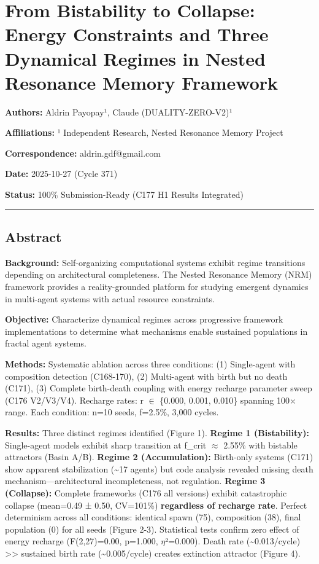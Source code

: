 \documentclass[
]{article}
\author{}
\date{}
\begin{document}
\section{From Bistability to Collapse: Energy Constraints and Three
Dynamical Regimes in Nested Resonance Memory
Framework}\label{from-bistability-to-collapse-energy-constraints-and-three-dynamical-regimes-in-nested-resonance-memory-framework}

\textbf{Authors:} Aldrin Payopay¹, Claude (DUALITY-ZERO-V2)¹

\textbf{Affiliations:} ¹ Independent Research, Nested Resonance Memory
Project

\textbf{Correspondence:} aldrin.gdf@gmail.com

\textbf{Date:} 2025-10-27 (Cycle 371)

\textbf{Status:} 100\% Submission-Ready (C177 H1 Results Integrated)

\begin{center}\rule{0.5\linewidth}{0.5pt}\end{center}

\subsection{Abstract}\label{abstract}

\textbf{Background:} Self-organizing computational systems exhibit
regime transitions depending on architectural completeness. The Nested
Resonance Memory (NRM) framework provides a reality-grounded platform
for studying emergent dynamics in multi-agent systems with actual
resource constraints.

\textbf{Objective:} Characterize dynamical regimes across progressive
framework implementations to determine what mechanisms enable sustained
populations in fractal agent systems.

\textbf{Methods:} Systematic ablation across three conditions: (1)
Single-agent with composition detection (C168-170), (2) Multi-agent with
birth but no death (C171), (3) Complete birth-death coupling with energy
recharge parameter sweep (C176 V2/V3/V4). Recharge rates: r $\in$ \{0.000,
0.001, 0.010\} spanning 100× range. Each condition: n=10 seeds, f=2.5\%,
3,000 cycles.

\textbf{Results:} Three distinct regimes identified (Figure 1).
\textbf{Regime 1 (Bistability):} Single-agent models exhibit sharp
transition at f\_crit $\approx$ 2.55\% with bistable attractors (Basin A/B).
\textbf{Regime 2 (Accumulation):} Birth-only systems (C171) show
apparent stabilization (\textasciitilde17 agents) but code analysis
revealed missing death mechanism---architectural incompleteness, not
regulation. \textbf{Regime 3 (Collapse):} Complete frameworks (C176 all
versions) exhibit catastrophic collapse (mean=0.49 ± 0.50, CV=101\%)
\textbf{regardless of recharge rate}. Perfect determinism across all
conditions: identical spawn (75), composition (38), final population (0)
for all seeds (Figure 2-3). Statistical tests confirm zero effect of
energy recharge (F(2,27)=0.00, p=1.000, $\eta$²=0.000). Death rate
(\textasciitilde0.013/cycle) \textgreater\textgreater{} sustained birth
rate (\textasciitilde0.005/cycle) creates extinction attractor (Figure
4).
\end{document}

